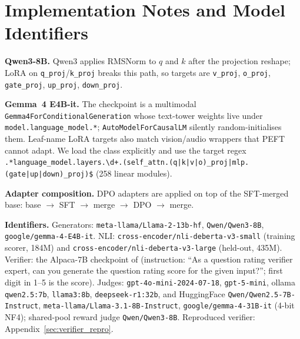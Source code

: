 \section{Implementation Notes and Model Identifiers}
\label{sec:impl_notes_appendix}
\label{sec:hf_identifiers}
\label{sec:case_study_appendix}

\textbf{Qwen3-8B.} Qwen3 applies RMSNorm to $q$ and $k$ after the projection reshape; LoRA on \texttt{q\_proj}/\texttt{k\_proj} breaks this path, so targets are \texttt{v\_proj}, \texttt{o\_proj}, \texttt{gate\_proj}, \texttt{up\_proj}, \texttt{down\_proj}.

\textbf{Gemma~4 E4B-it.} The checkpoint is a multimodal \texttt{Gemma4ForConditionalGeneration} whose text-tower weights live under \texttt{model.language\_model.*}; \texttt{AutoModelForCausalLM} silently random-initialises them. Leaf-name LoRA targets also match vision/audio wrappers that PEFT cannot adapt. We load the class explicitly and use the target regex \texttt{.*language\_model.layers.\textbackslash d+.(self\_attn.(q|k|v|o)\_proj|mlp.(gate|up|down)\_proj)\$} (258 linear modules).

\textbf{Adapter composition.} DPO adapters are applied on top of the SFT-merged base: base $\to$ SFT $\to$ merge $\to$ DPO $\to$ merge.

\textbf{Identifiers.} Generators: \texttt{meta-llama/Llama-2-13b-hf}, \texttt{Qwen/Qwen3-8B}, \texttt{google/gemma-4-E4B-it}. NLI: \texttt{cross-encoder/nli-deberta-v3-small} (training scorer, 184M) and \texttt{cross-encoder/nli-deberta-v3-large} (held-out, 435M). Verifier: the Alpaca-7B checkpoint of \citet{bao2025exploring} (instruction: ``As a question rating verifier expert, can you generate the question rating score for the given input?''; first digit in 1--5 is the score). Judges: \texttt{gpt-4o-mini-2024-07-18}, \texttt{gpt-5-mini}, ollama \texttt{qwen2.5:7b}, \texttt{llama3:8b}, \texttt{deepseek-r1:32b}, and HuggingFace \texttt{Qwen/Qwen2.5-7B-Instruct}, \texttt{meta-llama/Llama-3.1-8B-Instruct}, \texttt{google/gemma-4-31B-it} (4-bit NF4); shared-pool reward judge \texttt{Qwen/Qwen3-8B}. Reproduced verifier: Appendix~\ref{sec:verifier_repro}.
